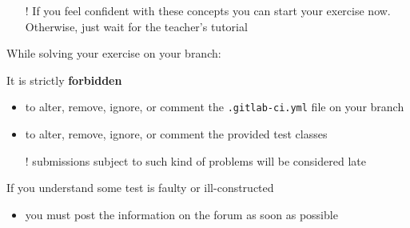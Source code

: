 \documentclass[presentation]{beamer}\mode<presentation>{\usetheme{AMSCesenaPurpleAndGold}}
\begin{document}
\begin{frame}[allowframebreaks]
\begin{itemize}
	\vspace{.3 cm}
	
	\item[!] If you feel confident with these concepts you can start your exercise now. 
	Otherwise, just wait for the teacher's tutorial
\end{itemize}

\framebreak

While solving your exercise on your branch:
%
\vspace{.3cm}
%
\begin{alertblock}{It is strictly \textbf{forbidden}}
	\begin{itemize}
		\item to alter, remove, ignore, or comment the \alert{\texttt{.gitlab-ci.yml}} file on your branch
		\item to alter, remove, ignore, or comment the provided test classes
		\item[!] submissions subject to such kind of problems will be considered \alert{late}
	\end{itemize}
\end{alertblock}
%
\vspace{.3cm}
%
\begin{exampleblock}{If you understand some test is faulty or ill-constructed}
	\begin{itemize}
		\item you \alert{must} post the information on the forum \alert{as soon as possible}
	\end{itemize}
\end{exampleblock}
\end{frame}

\section*{}

\frame{\titlepage}
\end{document}
